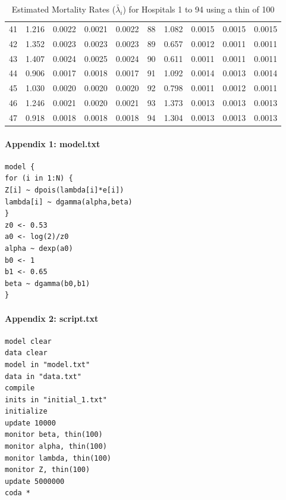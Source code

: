 \documentclass[12pt, leqno]{article}
\begin{document}
\begin{table}[ht]
{\begin{tabular}{r|r|r|r|r|r|r|r|r|r}
  41 & 1.216 & 0.0022 & 0.0021 & 0.0022 & 88 & 1.082 & 0.0015 & 0.0015 & 0.0015 \\ 
  42 & 1.352 & 0.0023 & 0.0023 & 0.0023 & 89 & 0.657 & 0.0012 & 0.0011 & 0.0011 \\ 
  43 & 1.407 & 0.0024 & 0.0025 & 0.0024 & 90 & 0.611 & 0.0011 & 0.0011 & 0.0011 \\ 
  44 & 0.906 & 0.0017 & 0.0018 & 0.0017 & 91 & 1.092 & 0.0014 & 0.0013 & 0.0014 \\ 
  45 & 1.030 & 0.0020 & 0.0020 & 0.0020 & 92 & 0.798 & 0.0011 & 0.0012 & 0.0011 \\ 
  46 & 1.246 & 0.0021 & 0.0020 & 0.0021 & 93 & 1.373 & 0.0013 & 0.0013 & 0.0013 \\ 
  47 & 0.918 & 0.0018 & 0.0018 & 0.0018 & 94 & 1.304 & 0.0013 & 0.0013 & 0.0013 \\ 
   \hline
   \hline
\end{tabular}
}
\caption{Estimated Mortality Rates ($\bar{\lambda}_i$) for Hospitals 1
  to 94 using a thin of 100} 
\label{mean100}
\end{table}

\clearpage

\paragraph{Appendix 1: model.txt}
\begin{verbatim}
model {
for (i in 1:N) {
Z[i] ~ dpois(lambda[i]*e[i])
lambda[i] ~ dgamma(alpha,beta)
}
z0 <- 0.53
a0 <- log(2)/z0
alpha ~ dexp(a0)
b0 <- 1
b1 <- 0.65
beta ~ dgamma(b0,b1)
}
\end{verbatim}

\paragraph{Appendix 2: script.txt}
\begin{verbatim}
model clear
data clear
model in "model.txt"
data in "data.txt"
compile
inits in "initial_1.txt"
initialize
update 10000
monitor beta, thin(100)
monitor alpha, thin(100)
monitor lambda, thin(100)
monitor Z, thin(100)
update 5000000
coda *
\end{verbatim}
\end{document}
